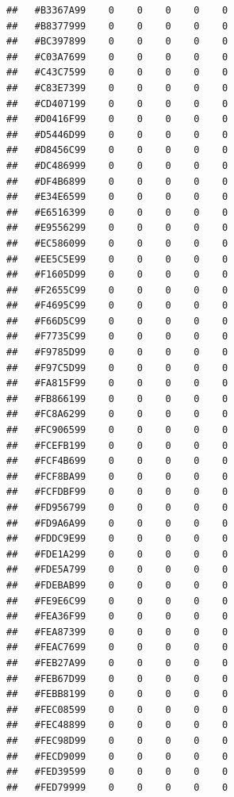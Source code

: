 \documentclass[
]{article}
\newenvironment{Shaded}{\begin{snugshade}}{\end{snugshade}}
\newcommand{\AttributeTok}[1]{\textcolor[rgb]{0.77,0.63,0.00}{#1}}
\newcommand{\DecValTok}[1]{\textcolor[rgb]{0.00,0.00,0.81}{#1}}
\newcommand{\FunctionTok}[1]{\textcolor[rgb]{0.00,0.00,0.00}{#1}}
\newcommand{\NormalTok}[1]{#1}
\newcommand{\OtherTok}[1]{\textcolor[rgb]{0.56,0.35,0.01}{#1}}
\newcommand{\SpecialCharTok}[1]{\textcolor[rgb]{0.00,0.00,0.00}{#1}}
\newcommand{\StringTok}[1]{\textcolor[rgb]{0.31,0.60,0.02}{#1}}
\theoremstyle{definition}
\theoremstyle{definition}
\theoremstyle{definition}
\theoremstyle{definition}
\theoremstyle{remark}
\begin{document}
\begin{verbatim}
##   #B3367A99    0    0    0    0    0
##   #B8377999    0    0    0    0    0
##   #BC397899    0    0    0    0    0
##   #C03A7699    0    0    0    0    0
##   #C43C7599    0    0    0    0    0
##   #C83E7399    0    0    0    0    0
##   #CD407199    0    0    0    0    0
##   #D0416F99    0    0    0    0    0
##   #D5446D99    0    0    0    0    0
##   #D8456C99    0    0    0    0    0
##   #DC486999    0    0    0    0    0
##   #DF4B6899    0    0    0    0    0
##   #E34E6599    0    0    0    0    0
##   #E6516399    0    0    0    0    0
##   #E9556299    0    0    0    0    0
##   #EC586099    0    0    0    0    0
##   #EE5C5E99    0    0    0    0    0
##   #F1605D99    0    0    0    0    0
##   #F2655C99    0    0    0    0    0
##   #F4695C99    0    0    0    0    0
##   #F66D5C99    0    0    0    0    0
##   #F7735C99    0    0    0    0    0
##   #F9785D99    0    0    0    0    0
##   #F97C5D99    0    0    0    0    0
##   #FA815F99    0    0    0    0    0
##   #FB866199    0    0    0    0    0
##   #FC8A6299    0    0    0    0    0
##   #FC906599    0    0    0    0    0
##   #FCEFB199    0    0    0    0    0
##   #FCF4B699    0    0    0    0    0
##   #FCF8BA99    0    0    0    0    0
##   #FCFDBF99    0    0    0    0    0
##   #FD956799    0    0    0    0    0
##   #FD9A6A99    0    0    0    0    0
##   #FDDC9E99    0    0    0    0    0
##   #FDE1A299    0    0    0    0    0
##   #FDE5A799    0    0    0    0    0
##   #FDEBAB99    0    0    0    0    0
##   #FE9E6C99    0    0    0    0    0
##   #FEA36F99    0    0    0    0    0
##   #FEA87399    0    0    0    0    0
##   #FEAC7699    0    0    0    0    0
##   #FEB27A99    0    0    0    0    0
##   #FEB67D99    0    0    0    0    0
##   #FEBB8199    0    0    0    0    0
##   #FEC08599    0    0    0    0    0
##   #FEC48899    0    0    0    0    0
##   #FEC98D99    0    0    0    0    0
##   #FECD9099    0    0    0    0    0
##   #FED39599    0    0    0    0    0
##   #FED79999    0    0    0    0    0
\end{verbatim}

\begin{Shaded}
\end{Shaded}
\end{document}
